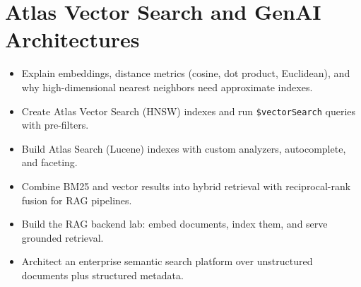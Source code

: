\chapter{Atlas Vector Search and GenAI Architectures}
%

\begin{objectives}
\begin{itemize}
    \item Explain embeddings, distance metrics (cosine, dot product, Euclidean), and why high-dimensional nearest neighbors need approximate indexes.
    \item Create Atlas Vector Search (HNSW) indexes and run \texttt{\$vectorSearch} queries with pre-filters.
    \item Build Atlas Search (Lucene) indexes with custom analyzers, autocomplete, and faceting.
    \item Combine BM25 and vector results into hybrid retrieval with reciprocal-rank fusion for RAG pipelines.
    \item Build the RAG backend lab: embed documents, index them, and serve grounded retrieval.
    \item Architect an enterprise semantic search platform over unstructured documents plus structured metadata.
\end{itemize}
\end{objectives}

